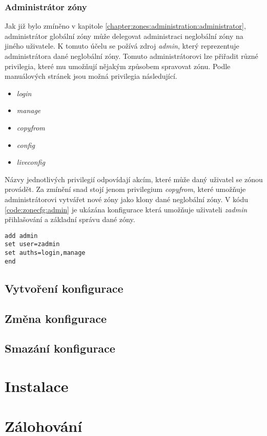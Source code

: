 \subsubsection{Administrátor zóny}
\label{chapter:zones:configuration:resources:admin}
Jak již bylo zmíněno v kapitole \ref{chapter:zones:administration:administrator}, administrátor globální zóny může delegovat 
administraci neglobální zóny na jiného uživatele. K tomuto účelu se požívá zdroj \textit{admin}, který reprezentuje administrátora
dané neglobální zóny. Tomuto administrátorovi lze přiřadit různé privilegia, které mu umožňují nějakým způsobem spravovat zónu.
Podle manuálových stránek \cite{oracle:manpages:zonecfg} jsou možná privilegia následující.
\begin{itemize}
 \item \textit{login}
 \item \textit{manage}
 \item \textit{copyfrom}
 \item \textit{config}
 \item \textit{liveconfig}
\end{itemize}
Názvy jednotlivých privilegií odpovídají akcím, které může daný uživatel se zónou provádět. Za zmínění snad stojí jenom 
privilegium \textit{copyfrom}, které umožňuje administrátorovi vytvářet nové zóny jako klony dané neglobální zóny. V kódu
\ref{code:zonecfg:admin} je ukázána konfigurace která umožňuje uživateli \textit{zadmin} přihlašování a základní správu dané
zóny.
\begin{lstlisting}[caption={Delegace administrace jinému uživateli}, float, label={code:zonecfg:admin}]
add admin
set user=zadmin
set auths=login,manage
end
\end{lstlisting}
\subsection{Vytvoření konfigurace}
\subsection{Změna konfigurace}
\subsection{Smazání konfigurace}

\section{Instalace}
\label{chapter:zones:instalation}
\section{Zálohování}
\label{chapter:zones:backup}